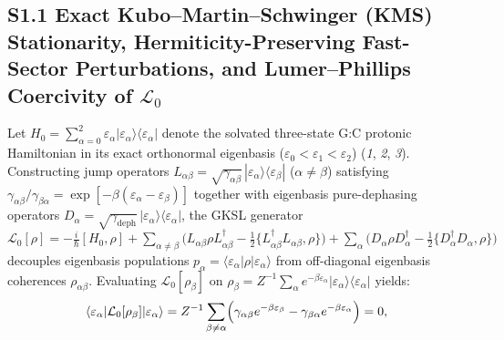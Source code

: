 \documentclass[10pt,letterpaper]{article}
\newcommand{\Lcal}{\mathcal{L}}
\begin{document}
\subsection*{S1.1 Exact Kubo--Martin--Schwinger (KMS) Stationarity, Hermiticity-Preserving Fast-Sector Perturbations, and Lumer--Phillips Coercivity of $\Lcal_0$}
Let $H_0 = \sum_{\alpha=0}^{2} \varepsilon_\alpha |\varepsilon_\alpha\rangle\langle\varepsilon_\alpha|$ denote the solvated three-state G:C protonic Hamiltonian in its exact orthonormal eigenbasis ($\varepsilon_0 < \varepsilon_1 < \varepsilon_2$) (\textit{1}, \textit{2}, \textit{3}). Constructing jump operators $L_{\alpha\beta} = \sqrt{\gamma_{\alpha\beta}}\,|\varepsilon_\alpha\rangle\langle\varepsilon_\beta|$ ($\alpha \neq \beta$) satisfying $\gamma_{\alpha\beta} / \gamma_{\beta\alpha} = \exp[-\beta(\varepsilon_\alpha - \varepsilon_\beta)]$ together with eigenbasis pure-dephasing operators $D_\alpha = \sqrt{\gamma_{\mathrm{deph}}}\,|\varepsilon_\alpha\rangle\langle\varepsilon_\alpha|$, the GKSL generator $\Lcal_0[\rho] = -\frac{i}{\hbar}[H_0, \rho] + \sum_{\alpha\neq\beta}\bigl(L_{\alpha\beta}\rho L_{\alpha\beta}^\dagger - \frac{1}{2}\{L_{\alpha\beta}^\dagger L_{\alpha\beta}, \rho\}\bigr) + \sum_\alpha\bigl(D_\alpha\rho D_\alpha^\dagger - \frac{1}{2}\{D_\alpha^\dagger D_\alpha, \rho\}\bigr)$ decouples eigenbasis populations $p_\alpha = \langle\varepsilon_\alpha|\rho|\varepsilon_\alpha\rangle$ from off-diagonal eigenbasis coherences $\rho_{\alpha\beta}$. Evaluating $\Lcal_0[\rho_\beta]$ on $\rho_\beta = Z^{-1}\sum_\alpha e^{-\beta\varepsilon_\alpha}|\varepsilon_\alpha\rangle\langle\varepsilon_\alpha|$ yields:
\begin{equation}
    \langle\varepsilon_\alpha|\Lcal_0[\rho_\beta]|\varepsilon_\alpha\rangle = Z^{-1}\sum_{\beta\neq\alpha}\Bigl(\gamma_{\alpha\beta}e^{-\beta\varepsilon_\beta} - \gamma_{\beta\alpha}e^{-\beta\varepsilon_\alpha}\Bigr) = 0,
\end{equation}
\end{document}
